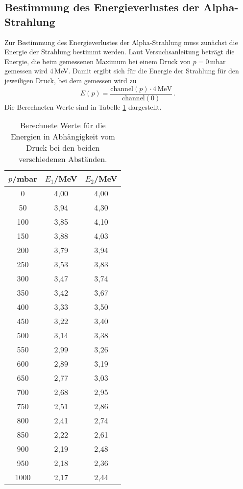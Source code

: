 \subsection{Bestimmung des Energieverlustes der Alpha-Strahlung}
\label{subsec:energie}

Zur Bestimmung des Energieverlustes der Alpha-Strahlung muss zunächst die Energie
der Strahlung bestimmt werden. Laut Versuchsanleitung \cite{Versuchsanleitung}
beträgt die Energie, die beim gemessenen Maximum bei einem Druck von $p=0\,$mbar
gemessen wird 4\,MeV. Damit ergibt sich für die Energie der Strahlung für den jeweiligen
Druck, bei dem gemessen wird zu
\begin{equation}
  E(p)=\frac{\text{channel}(p)\cdot4\,\text{MeV}}{\text{channel}(0)} \,.
\end{equation}
Die Berechneten Werte sind in Tabelle \ref{tab:energie} dargestellt.

\begin{table}[htp]
	\begin{center}
    \caption{Berechnete Werte für die Energien
    in Abhängigkeit vom Druck bei den beiden verschiedenen Abständen.}
    \label{tab:energie}
		\begin{tabular}{ccc}
		\toprule
			{$p$/mbar} & {$E_1$/MeV} & {$E_2$/MeV}\\
			\midrule
			0 & 4,00 & 4,00\\
			50 & 3,94 & 4,30\\
			100 & 3,85 & 4,10\\
			150 & 3,88 & 4,03\\
			200 & 3,79 & 3,94\\
			250 & 3,53 & 3,83\\
			300 & 3,47 & 3,74\\
			350 & 3,42 & 3,67\\
			400 & 3,33 & 3,50\\
			450 & 3,22 & 3,40\\
			500 & 3,14 & 3,38\\
			550 & 2,99 & 3,26\\
			600 & 2,89 & 3,19\\
			650 & 2,77 & 3,03\\
			700 & 2,68 & 2,95\\
			750 & 2,51 & 2,86\\
			800 & 2,41 & 2,74\\
			850 & 2,22 & 2,61\\
			900 & 2,19 & 2,48\\
			950 & 2,18 & 2,36\\
			1000 & 2,17 & 2,44\\
		\bottomrule
		\end{tabular}
	\end{center}
\end{table}


